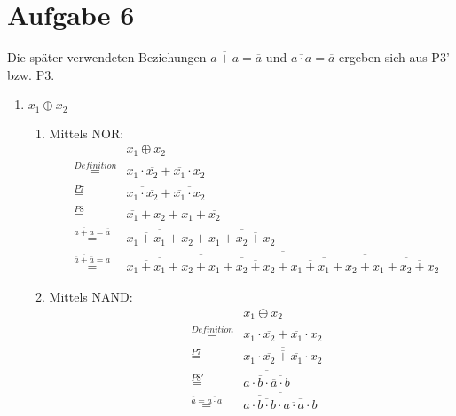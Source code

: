 \documentclass[a4paper]{article}
\begin{document}
\section*{Aufgabe 6}
Die später verwendeten Beziehungen $\overline{a + a} = \overline{a}$ und $\overline{a \cdot a} = \overline{a}$ ergeben sich aus P3' bzw. P3.
\begin{enumerate}[label=\alph*)]
	\item $x_1 \oplus x_2 $
	\begin{enumerate}
		\item Mittels NOR:
		\begin{equation}
		\begin{aligned}
			&&x_1 \oplus x_2 \\
			&\stackrel{Definition}{=} &x_1 \cdot \overline{x_2} + \overline{x_1} \cdot x_2 \\
			&\stackrel{P7}{=} &\overline{\overline{x_1 \cdot \overline{x_2}}} + \overline{\overline{\overline{x_1} \cdot x_2}} \\
			&\stackrel{P8}{= } &\overline{\overline{x_1} + x_2} + \overline{x_1 + \overline{x_2}} \\
			&\stackrel{\overline{a + a} = \overline{a}}{=} & \overline{\overline{x_1 + x_1} + x_2} + \overline{x_1 + \overline{x_2 + x_2}} \\
			&\stackrel{\overline{\overline{a} + \overline{a}} = a}{=} &\overline{\overline{\overline{\overline{x_1 + x_1} + x_2} + \overline{x_1 + \overline{x_2 + x_2}}} + \overline{\overline{\overline{x_1 + x_1} + x_2} + \overline{x_1 + \overline{x_2 + x_2}}}}
		\end{aligned}
		\end{equation} 
		
		\item Mittels NAND:
		\begin{equation}
		\begin{aligned}
			&&x_1 \oplus x_2 \\
			&\stackrel{Definition}{=} &x_1 \cdot \overline{x_2} + \overline{x_1} \cdot x_2 \\
			&\stackrel{P7}{=} &\overline{\overline{x_1 \cdot \overline{x_2} + \overline{x_1} \cdot x_2}} \\
			&\stackrel{P8'}{=} &\overline{\overline{a \cdot \overline{b}} \cdot \overline{\overline{a} \cdot b}} \\
			&\stackrel{\overline{a} = \overline{a \cdot a}}{=} &\overline{\overline{a \cdot \overline{b \cdot b}} \cdot \overline{\overline{a \cdot a} \cdot b}}
		\end{aligned}
		\end{equation}
	\end{enumerate}
	
\end{enumerate}
\end{document}
